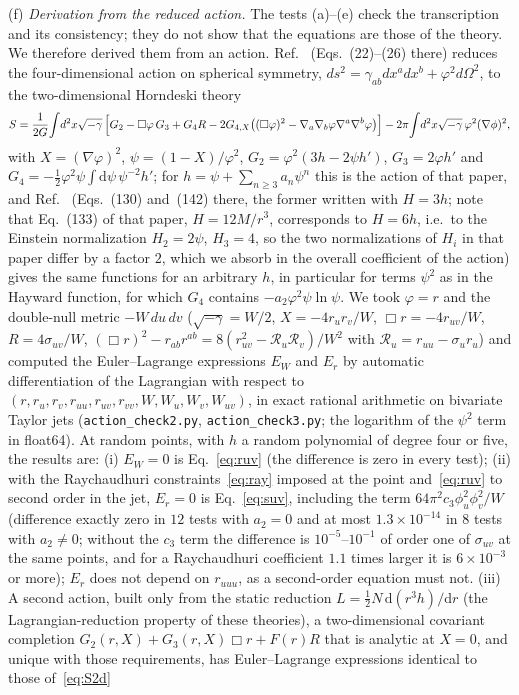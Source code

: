 \documentclass[11pt]{article}
\begin{document}
(f) \emph{Derivation from the reduced action.} The tests (a)--(e) check the transcription and its consistency; they do not show that the equations are those of the theory. We therefore derived them from an action. Ref.~\cite{BuenoCanoHennigarMurcia2025} (Eqs.~(22)--(26) there) reduces the four-dimensional action on spherical symmetry, $ds^{2}=\gamma_{ab}dx^{a}dx^{b}+\varphi^{2}d\Omega^{2}$, to the two-dimensional Horndeski theory
\begin{equation}
S=\frac1{2G}\!\int\! d^{2}x\sqrt{-\gamma}\,\Bigl[G_2-\Box\varphi\,G_3+G_4R-2G_{4,X}\bigl((\Box\varphi)^{2}-\nabla_a\nabla_b\varphi\nabla^a\nabla^b\varphi\bigr)\Bigr]-2\pi\!\int\! d^{2}x\sqrt{-\gamma}\,\varphi^{2}(\nabla\phi)^{2},
\label{eq:S2d}
\end{equation}
with $X=(\nabla\varphi)^{2}$, $\psi=(1-X)/\varphi^{2}$, $G_2=\varphi^{2}(3h-2\psi h')$, $G_3=2\varphi h'$ and $G_4=-\tfrac12\varphi^{2}\psi\!\int\!\mathrm d\psi\,\psi^{-2}h'$; for $h=\psi+\sum_{n\ge3}a_n\psi^{n}$ this is the action of that paper, and Ref.~\cite{BorissovaCarballoRubio2026} (Eqs.~(130) and~(142) there, the former written with $H=3h$; note that Eq.~(133) of that paper, $H=12M/r^{3}$, corresponds to $H=6h$, i.e.\ to the Einstein normalization $H_2=2\psi$, $H_3=4$, so the two normalizations of $H_i$ in that paper differ by a factor $2$, which we absorb in the overall coefficient of the action) gives the same functions for an arbitrary $h$, in particular for terms $\psi^{2}$ as in the Hayward function, for which $G_4$ contains $-a_2\varphi^{2}\psi\ln\psi$. We took $\varphi=r$ and the double-null metric $-W\,du\,dv$ ($\sqrt{-\gamma}=W/2$, $X=-4r_ur_v/W$, $\Box r=-4r_{uv}/W$, $R=4\sigma_{uv}/W$, $(\Box r)^{2}-r_{ab}r^{ab}=8(r_{uv}^{2}-\mathcal R_u\mathcal R_v)/W^{2}$ with $\mathcal R_u=r_{uu}-\sigma_ur_u$) and computed the Euler--Lagrange expressions $E_W$ and $E_r$ by automatic differentiation of the Lagrangian with respect to $(r,r_u,r_v,r_{uu},r_{uv},r_{vv},W,W_u,W_v,W_{uv})$, in exact rational arithmetic on bivariate Taylor jets (\texttt{action\_check2.py}, \texttt{action\_check3.py}; the logarithm of the $\psi^{2}$ term in float64). At random points, with $h$ a random polynomial of degree four or five, the results are: (i) $E_W=0$ is Eq.~\eqref{eq:ruv} (the difference is zero in every test); (ii) with the Raychaudhuri constraints~\eqref{eq:ray} imposed at the point and~\eqref{eq:ruv} to second order in the jet, $E_r=0$ is Eq.~\eqref{eq:suv}, including the term $64\pi^{2}c_3\phi_u^{2}\phi_v^{2}/W$ (difference exactly zero in $12$ tests with $a_2=0$ and at most $1.3\times10^{-14}$ in $8$ tests with $a_2\ne0$; without the $c_3$ term the difference is $10^{-5}$--$10^{-1}$ of order one of $\sigma_{uv}$ at the same points, and for a Raychaudhuri coefficient $1.1$ times larger it is $6\times10^{-3}$ or more); $E_r$ does not depend on $r_{uuu}$, as a second-order equation must not. (iii) A second action, built only from the static reduction $L=\tfrac12N\,\mathrm d(r^{3}h)/\mathrm dr$ (the Lagrangian-reduction property of these theories), a two-dimensional covariant completion $G_2(r,X)+G_3(r,X)\Box r+F(r)R$ that is analytic at $X=0$, and unique with those requirements, has Euler--Lagrange expressions identical to those of~\eqref{eq:S2d} 
\end{document}
